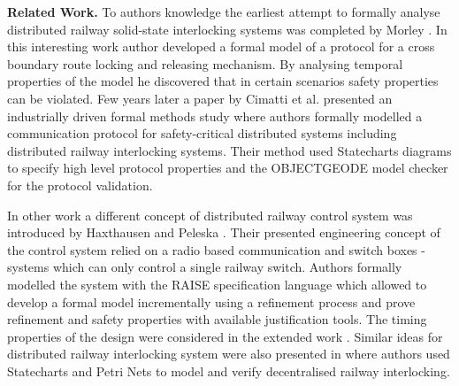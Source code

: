 \noindent \textbf{Related Work.} To authors knowledge the earliest attempt to formally analyse distributed railway solid-state interlocking systems was completed by Morley \cite{morley1996safety}. In this interesting work author developed a formal model of a protocol for a cross boundary route locking and releasing mechanism. By analysing temporal properties of the model he discovered that in certain scenarios safety properties can be violated. Few years later a paper by Cimatti et al. \cite{cimatti1999formal} presented an industrially driven formal methods study where authors formally modelled a communication protocol for safety-critical distributed systems including distributed railway interlocking systems. Their method used Statecharts diagrams to specify high level protocol properties and the \scriptsize{OBJECT}\normalsize{GEODE} model checker for the protocol validation. 

In other work a different concept of distributed railway control system was introduced by Haxthausen and Peleska \cite{haxthausen2000formal}. Their presented engineering concept of the control system relied on a radio based communication and switch boxes - systems which can only control a single railway switch. Authors formally modelled the system with the RAISE \cite{george1995raise} specification language  which allowed to develop a formal model incrementally using a refinement process and prove refinement and safety properties with available justification tools. The timing properties of the design were considered in the extended work \cite{madsen2005modelling}. Similar ideas for distributed railway interlocking system were also presented in \cite{banci2004role, hei2008toward} where authors used Statecharts and Petri Nets to model and verify decentralised railway interlocking. 
